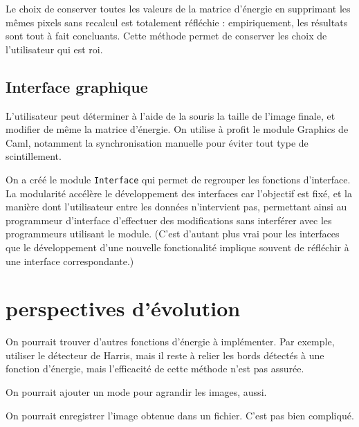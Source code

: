 \documentclass[a4paper]{article}
\begin{document}
Le choix de conserver toutes les valeurs de la matrice d'énergie en supprimant les mêmes pixels sans recalcul est totalement réfléchie : empiriquement, les résultats sont tout à fait concluants. Cette méthode permet de conserver les choix de l'utilisateur qui est roi.


\subsection{Interface graphique}

L'utilisateur peut déterminer à l'aide de la souris la taille de l'image finale, et modifier de même la matrice d'énergie. On utilise à profit le module Graphics de Caml, notamment la synchronisation manuelle pour éviter tout type de scintillement.

On a créé le module {\tt Interface} qui permet de regrouper les fonctions d'interface. La modularité
accélère le développement des interfaces car l'objectif est fixé, et la manière dont l'utilisateur entre les données n'intervient pas, permettant ainsi au programmeur d'interface d'effectuer des modifications sans interférer avec les programmeurs utilisant le module. (C'est d'autant plus vrai pour les interfaces que le développement d'une nouvelle fonctionalité implique souvent de réfléchir à une interface correspondante.)

\section{perspectives d'évolution}

On pourrait trouver d'autres fonctions d'énergie à implémenter. Par exemple, utiliser le détecteur de Harris, mais il reste à relier les bords détectés à une fonction d'énergie, mais l'efficacité de cette méthode n'est pas assurée.

On pourrait ajouter un mode pour agrandir les images, aussi.

On pourrait enregistrer l'image obtenue dans un fichier. C'est pas bien compliqué.
\end{document}
